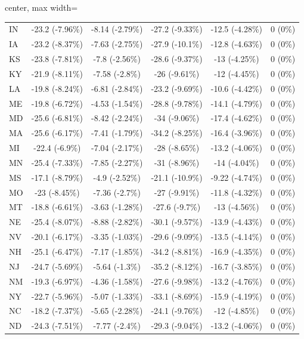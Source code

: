 \begin{table}[!htbp]
\begin{adjustbox}{center, max width=\textwidth}
\begin{threeparttable}
\begin{tabular}{lccccc}
IN & -23.2 (-7.96\%) & -8.14 (-2.79\%) & -27.2 (-9.33\%) & -12.5 (-4.28\%) & 0 (0\%) \\
IA & -23.2 (-8.37\%) & -7.63 (-2.75\%) & -27.9 (-10.1\%) & -12.8 (-4.63\%) & 0 (0\%) \\
KS & -23.8 (-7.81\%) & -7.8 (-2.56\%) & -28.6 (-9.37\%) & -13 (-4.25\%) & 0 (0\%) \\
KY & -21.9 (-8.11\%) & -7.58 (-2.8\%) & -26 (-9.61\%) & -12 (-4.45\%) & 0 (0\%) \\
LA & -19.8 (-8.24\%) & -6.81 (-2.84\%) & -23.2 (-9.69\%) & -10.6 (-4.42\%) & 0 (0\%) \\
ME & -19.8 (-6.72\%) & -4.53 (-1.54\%) & -28.8 (-9.78\%) & -14.1 (-4.79\%) & 0 (0\%) \\
MD & -25.6 (-6.81\%) & -8.42 (-2.24\%) & -34 (-9.06\%) & -17.4 (-4.62\%) & 0 (0\%) \\
MA & -25.6 (-6.17\%) & -7.41 (-1.79\%) & -34.2 (-8.25\%) & -16.4 (-3.96\%) & 0 (0\%) \\
MI & -22.4 (-6.9\%) & -7.04 (-2.17\%) & -28 (-8.65\%) & -13.2 (-4.06\%) & 0 (0\%) \\
MN & -25.4 (-7.33\%) & -7.85 (-2.27\%) & -31 (-8.96\%) & -14 (-4.04\%) & 0 (0\%) \\
MS & -17.1 (-8.79\%) & -4.9 (-2.52\%) & -21.1 (-10.9\%) & -9.22 (-4.74\%) & 0 (0\%) \\
MO & -23 (-8.45\%) & -7.36 (-2.7\%) & -27 (-9.91\%) & -11.8 (-4.32\%) & 0 (0\%) \\
MT & -18.8 (-6.61\%) & -3.63 (-1.28\%) & -27.6 (-9.7\%) & -13 (-4.56\%) & 0 (0\%) \\
NE & -25.4 (-8.07\%) & -8.88 (-2.82\%) & -30.1 (-9.57\%) & -13.9 (-4.43\%) & 0 (0\%) \\
NV & -20.1 (-6.17\%) & -3.35 (-1.03\%) & -29.6 (-9.09\%) & -13.5 (-4.14\%) & 0 (0\%) \\
NH & -25.1 (-6.47\%) & -7.17 (-1.85\%) & -34.2 (-8.81\%) & -16.9 (-4.35\%) & 0 (0\%) \\
NJ & -24.7 (-5.69\%) & -5.64 (-1.3\%) & -35.2 (-8.12\%) & -16.7 (-3.85\%) & 0 (0\%) \\
NM & -19.3 (-6.97\%) & -4.36 (-1.58\%) & -27.6 (-9.98\%) & -13.2 (-4.76\%) & 0 (0\%) \\
NY & -22.7 (-5.96\%) & -5.07 (-1.33\%) & -33.1 (-8.69\%) & -15.9 (-4.19\%) & 0 (0\%) \\
NC & -18.2 (-7.37\%) & -5.65 (-2.28\%) & -24.1 (-9.76\%) & -12 (-4.85\%) & 0 (0\%) \\
ND & -24.3 (-7.51\%) & -7.77 (-2.4\%) & -29.3 (-9.04\%) & -13.2 (-4.06\%) & 0 (0\%) \\

\end{tabular}
\end{threeparttable}
\end{adjustbox}
\end{table}
